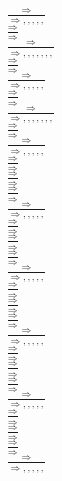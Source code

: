 \documentclass[11pt]{article}
\begin{document}
\begin{center}
\bigskip
\\$\frac{\Rightarrow }{\Rightarrow , , , , , }$
\bigskip
\\$\frac{\Rightarrow }{\Rightarrow }$
\bigskip
\\$\frac{\Rightarrow }{\Rightarrow , , , , , , , }$
\bigskip
\\$\frac{\Rightarrow }{\Rightarrow }$
\bigskip
\\$\frac{\Rightarrow }{\Rightarrow , , , , , }$
\bigskip
\\$\frac{\Rightarrow }{\Rightarrow }$
\bigskip
\\$\frac{\Rightarrow }{\Rightarrow , , , , , , , }$
\bigskip
\\$\frac{\Rightarrow }{\Rightarrow }$
\bigskip
\\$\frac{\Rightarrow }{\Rightarrow , , , , , }$
\bigskip
\\$\frac{\Rightarrow }{\Rightarrow }$
\bigskip
\\$\frac{\Rightarrow }{\Rightarrow }$
\bigskip
\\$\frac{\Rightarrow }{\Rightarrow }$
\bigskip
\\$\frac{\Rightarrow }{\Rightarrow , , , , , }$
\bigskip
\\$\frac{\Rightarrow }{\Rightarrow }$
\bigskip
\\$\frac{\Rightarrow }{\Rightarrow }$
\bigskip
\\$\frac{\Rightarrow }{\Rightarrow }$
\bigskip
\\$\frac{\Rightarrow }{\Rightarrow , , , , , }$
\bigskip
\\$\frac{\Rightarrow }{\Rightarrow }$
\bigskip
\\$\frac{\Rightarrow }{\Rightarrow }$
\bigskip
\\$\frac{\Rightarrow }{\Rightarrow }$
\bigskip
\\$\frac{\Rightarrow }{\Rightarrow , , , , , }$
\bigskip
\\$\frac{\Rightarrow }{\Rightarrow }$
\bigskip
\\$\frac{\Rightarrow }{\Rightarrow }$
\bigskip
\\$\frac{\Rightarrow }{\Rightarrow }$
\bigskip
\\$\frac{\Rightarrow }{\Rightarrow , , , , , }$
\bigskip
\\$\frac{\Rightarrow }{\Rightarrow }$
\bigskip
\\$\frac{\Rightarrow }{\Rightarrow }$
\bigskip
\\$\frac{\Rightarrow }{\Rightarrow }$
\bigskip
\\$\frac{\Rightarrow }{\Rightarrow , , , , , }$

\end{center}
\end{document}
